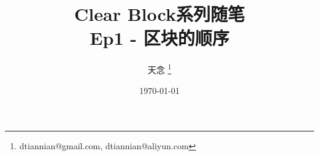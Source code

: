 \documentclass{beamer}
\title{Clear Block系列随笔 \\ Ep1 - 区块的顺序}
\author{天念 \thanks{dtiannian@gmail.com, dtiannian@aliyun.com}}
\date{\today}
\begin{document}
\begin{frame}
    \titlepage
\end{frame}
\end{document}
